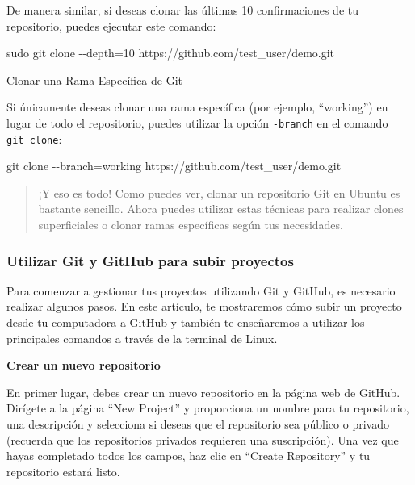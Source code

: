 \documentclass[
  a4paper,
]{article}
\newenvironment{Shaded}{}{}
\newcommand{\AttributeTok}[1]{\textcolor[rgb]{0.84,0.23,0.29}{#1}}
\newcommand{\FunctionTok}[1]{\textcolor[rgb]{0.44,0.26,0.76}{#1}}
\newcommand{\NormalTok}[1]{\textcolor[rgb]{0.14,0.16,0.18}{#1}}
\newcommand{\OperatorTok}[1]{\textcolor[rgb]{0.14,0.16,0.18}{#1}}
\begin{document}
De manera similar, si deseas clonar las últimas 10 confirmaciones de tu
repositorio, puedes ejecutar este comando:

\begin{Shaded}
\begin{Highlighting}[]
\FunctionTok{sudo}\NormalTok{ git clone }\AttributeTok{{-}{-}depth}\OperatorTok{=}\NormalTok{10 https://github.com/test\_user/demo.git}
\end{Highlighting}
\end{Shaded}

Clonar una Rama Específica de Git

Si únicamente deseas clonar una rama específica (por ejemplo,
``working'') en lugar de todo el repositorio, puedes utilizar la opción
\texttt{-branch} en el comando \texttt{git\ clone}:

\begin{Shaded}
\begin{Highlighting}[]
\FunctionTok{git}\NormalTok{ clone }\AttributeTok{{-}{-}branch}\OperatorTok{=}\NormalTok{working https://github.com/test\_user/demo.git}
\end{Highlighting}
\end{Shaded}

\begin{quote}
¡Y eso es todo! Como puedes ver, clonar un repositorio Git en Ubuntu es
bastante sencillo. Ahora puedes utilizar estas técnicas para realizar
clones superficiales o clonar ramas específicas según tus necesidades.
\end{quote}

\subsubsection{Utilizar Git y GitHub para subir
proyectos}\label{utilizar-git-y-github-para-subir-proyectos}

Para comenzar a gestionar tus proyectos utilizando Git y GitHub, es
necesario realizar algunos pasos. En este artículo, te mostraremos cómo
subir un proyecto desde tu computadora a GitHub y también te enseñaremos
a utilizar los principales comandos a través de la terminal de Linux.

\textbf{Crear un nuevo repositorio}

En primer lugar, debes crear un nuevo repositorio en la página web de
GitHub. Dirígete a la página ``New Project'' y proporciona un nombre
para tu repositorio, una descripción y selecciona si deseas que el
repositorio sea público o privado (recuerda que los repositorios
privados requieren una suscripción). Una vez que hayas completado todos
los campos, haz clic en ``Create Repository'' y tu repositorio estará
listo.
\end{document}
